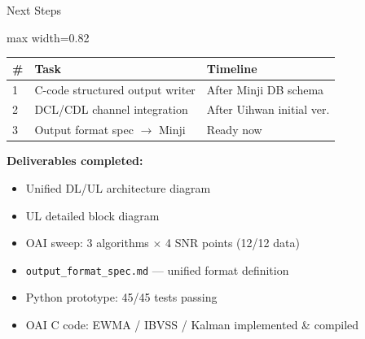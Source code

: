 \documentclass[aspectratio=169, 11pt]{beamer}
\begin{document}
\begin{frame}{Next Steps}
\centering
\small
\begin{adjustbox}{max width=0.82\linewidth}
\begin{tabular}{lll}
\toprule
\textbf{\#} & \textbf{Task} & \textbf{Timeline} \\
\midrule
1 & C-code structured output writer & After Minji DB schema \\
2 & DCL/CDL channel integration     & After Uihwan initial ver. \\
3 & Output format spec $\to$ Minji  & Ready now \\
\bottomrule
\end{tabular}
\end{adjustbox}

\vspace{8pt}
\raggedright
\textbf{Deliverables completed:}
\footnotesize
\begin{itemize}
  \item Unified DL/UL architecture diagram
  \item UL detailed block diagram
  \item OAI sweep: 3 algorithms $\times$ 4 SNR points (12/12 data)
  \item \texttt{output\_format\_spec.md} — unified format definition
  \item Python prototype: 45/45 tests passing
  \item OAI C code: EWMA / IBVSS / Kalman implemented \& compiled
\end{itemize}
\end{frame}
\end{document}
